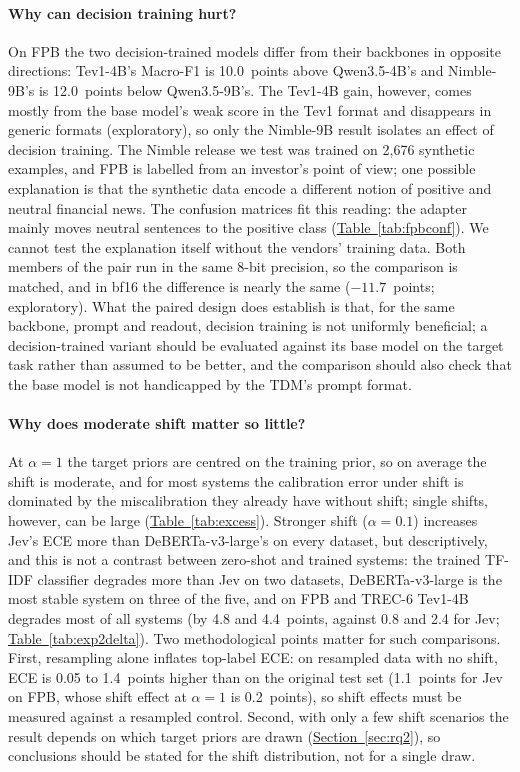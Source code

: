 \paragraph{Why can decision training hurt?}
On FPB the two decision-trained models differ from their backbones in opposite directions: Tev1-4B's Macro-F1 is 10.0~points above Qwen3.5-4B's and Nimble-9B's is 12.0~points below Qwen3.5-9B's. The Tev1-4B gain, however, comes mostly from the base model's weak
score in the Tev1 format and disappears in generic formats (exploratory), so only the Nimble-9B result isolates an
effect of decision training. The Nimble release we test was trained on
2{,}676 synthetic examples, and FPB is labelled from an investor's point of view; one possible explanation is that the
synthetic data encode a different notion of positive and neutral financial news. The confusion matrices fit this
reading: the adapter mainly moves neutral sentences to the positive class (\hyperref[tab:fpbconf]{Table~\ref*{tab:fpbconf}}). We cannot test the
explanation itself without the vendors' training data. Both members of the pair run in the same 8-bit precision, so the comparison is matched, and
in bf16 the difference is nearly the same ($-11.7$~points; exploratory). What the paired design does establish is that,
for the same backbone, prompt and readout, decision training is not uniformly beneficial; a decision-trained variant
should be evaluated against its base model on the target task rather than assumed to be better, and the comparison
should also check that the base model is not handicapped by the TDM's prompt format.

\paragraph{Why does moderate shift matter so little?}
At $\alpha=1$ the target priors are centred on the training prior, so on average the shift is moderate, and for most
systems the calibration error under shift is dominated by the miscalibration they already have without shift; single
shifts, however, can be large (\hyperref[tab:excess]{Table~\ref*{tab:excess}}). Stronger shift ($\alpha=0.1$)
increases Jev's ECE more than DeBERTa-v3-large's on every dataset, but descriptively, and this is not a contrast between
zero-shot and trained systems: the trained TF-IDF classifier degrades more than Jev on two datasets, DeBERTa-v3-large is
the most stable system on three of the five, and on FPB and TREC-6 Tev1-4B degrades most of all systems (by 4.8 and 4.4~points, against 0.8 and 2.4 for Jev; \hyperref[tab:exp2delta]{Table~\ref*{tab:exp2delta}}). Two methodological points matter for such comparisons. First, resampling alone inflates
top-label ECE: on resampled data with no shift, ECE is 0.05 to 1.4~points higher than on the original test set (1.1~points for Jev on FPB, whose shift effect at $\alpha=1$ is 0.2~points), so shift effects must be measured against a
resampled control. Second, with only a few shift scenarios the result depends on which target priors are drawn
(\hyperref[sec:rq2]{Section~\ref*{sec:rq2}}), so conclusions should be stated for the shift distribution, not for a single draw.

